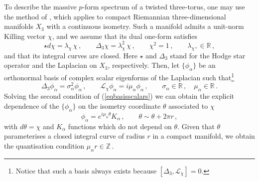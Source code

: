 \documentclass[11pt]{article}
\def\a {\alpha}
\def\th {{\theta}}
\newcommand{\IR}{\mathbb{R}}
\begin{document}
To describe the massive $p$-form spectrum of a twisted three-torus, one may use the method of  \cite{Ben_Achour_2016}, which applies to compact Riemannian three-dimensional manifolds $X_3$ with a continuous isometry.  Such a manifold admits a unit-norm Killing vector $\chi$, and we assume that its dual one-form satisfies 
\begin{equation}
	\star d \chi = \lambda_\chi \,\chi \,, \qquad \Delta_3 \chi = \lambda_\chi^2\, \chi \,, \qquad \chi^2 = 1  \,, \qquad  \lambda_\chi, \in \IR \, ,
\end{equation}
and that its integral curves are closed. Here $\star$ and $\Delta_3$ stand for the Hodge star operator and the Laplacian on $X_3$, respectively. Then, let $\{\phi_\a\}$ be an orthonormal basis of complex scalar eigenforms of the Laplacian such that\footnote{Notice that such 
 a basis always exists because $[\Delta_3, \mathcal{L}_\chi ] = 0$. }
\begin{equation} \label{eqbasisscalars}
	\Delta_3 \phi_\a = \sigma_\a^2 \phi_\a \,,\qquad \mathcal{L}_\chi \phi_\a = i \mu_\a \phi_\a \,, \qquad   \sigma_\a \in \mathbb{R} \,, \quad  \mu_\a \in \mathbb{R}\,.
\end{equation} 
Solving the second condition of (\ref{eqbasisscalars}) we can obtain the explicit dependence of  the $\{\phi_\a\}$ on the isometry coordinate $\th$ associated to $\chi$
\begin{equation}\label{eqphiexp}
	\phi_\a = e^{i \mu_\a \theta} K_\a \,, \qquad \th \sim \th + 2\pi r \, ,
\end{equation}
with $d\theta =\chi$ and $K_\a$ functions which do not depend on $\th$. Given that $\th$ parameterises a closed integral curve of radius $r$ in a compact manifold, we obtain the quantisation condition $\mu_\a r \in  \mathbb{Z} $\,. 
\end{document}
